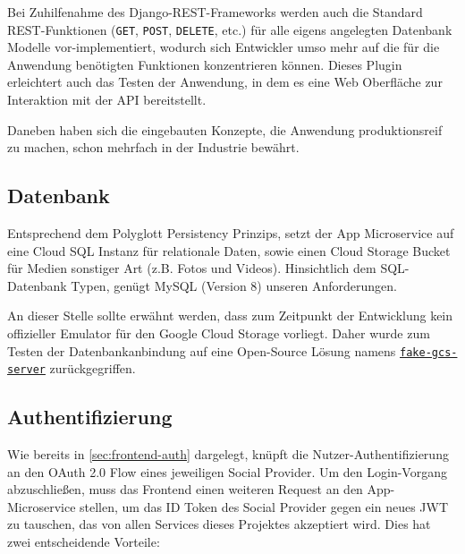 \documentclass{article}
\begin{document}
Bei Zuhilfenahme des Django-REST-Frameworks werden auch die Standard REST-Funktionen (\texttt{GET}, \texttt{POST}, \texttt{DELETE}, etc.) für alle eigens angelegten Datenbank Modelle vor-implementiert, wodurch sich Entwickler umso mehr auf die für die Anwendung benötigten Funktionen konzentrieren können. Dieses Plugin erleichtert auch das Testen der Anwendung, in dem es eine Web Oberfläche zur Interaktion mit der API bereitstellt. 

Daneben haben sich die eingebauten Konzepte, die Anwendung produktionsreif zu machen, schon mehrfach in der Industrie bewährt. 


\subsection{Datenbank}
\label{sec:app-database}

Entsprechend dem Polyglott Persistency Prinzips, setzt der App Microservice auf eine Cloud SQL Instanz für relationale Daten, sowie einen Cloud Storage Bucket für Medien sonstiger Art (z.B. Fotos und Videos). Hinsichtlich dem SQL-Datenbank Typen, genügt MySQL (Version 8) unseren Anforderungen. 

An dieser Stelle sollte erwähnt werden, dass zum Zeitpunkt der Entwicklung kein offizieller Emulator für den Google Cloud Storage vorliegt. Daher wurde zum Testen der Datenbankanbindung auf eine Open-Source Lösung namens \href{https://github.com/fsouza/fake-gcs-server}{\texttt{fake-gcs-server}} zurückgegriffen. 


\subsection{Authentifizierung}
\label{sec:app-backend-auth}

Wie bereits in \autoref{sec:frontend-auth} dargelegt, knüpft die Nutzer-Authentifizierung an den OAuth 2.0 Flow eines jeweiligen Social Provider. Um den Login-Vorgang abzuschließen, muss das Frontend einen weiteren Request an den App-Microservice stellen, um das ID Token des Social Provider gegen ein neues JWT zu tauschen, das von allen Services dieses Projektes akzeptiert wird. Dies hat zwei entscheidende Vorteile:
\end{document}
